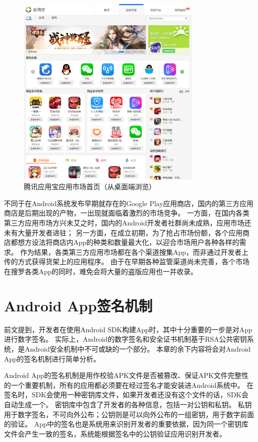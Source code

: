 \begin{figure}[htbp]
	\centering
	\includegraphics[width=0.8\textwidth]{./Figures/edwin-yyb.jpg}
	\caption{腾讯应用宝应用市场首页（从桌面端浏览）}
	\label{fig:mkt-yyb}
	\vspace{-5mm}
\end{figure}

不同于在Android系统发布早期就存在的Google Play应用商店，国内的第三方应用商店是后期出现的产物，一出现就面临着激烈的市场竞争。
一方面，在国内各类第三方应用市场方兴未艾之时，国内的Android开发者社群尚未成熟，应用市场还未有大量开发者进驻；
另一方面，在成立初期，为了抢占市场份额，各个应用商店都想方设法将商店内App的种类和数量最大化，以迎合市场用户各种各样的需求。
作为结果，各类第三方应用市场都在各个渠道搜集App，而非通过开发者上传的方式获得货架上的应用程序。
由于在早期各种监管渠道尚未完善，各个市场在搜罗各类App的同时，难免会将大量的盗版应用也一并收录。

\section{Android App签名机制}
\label{sec:signature}

前文提到，开发者在使用Android SDK构建App时，其中十分重要的一步是对App进行数字签名。
实际上，Android的数字签名和安全证书机制基于RSA公共密钥系统，是Android安全机制中不可或缺的一个部分。
本章的余下内容将会对Android App的签名机制进行简单分析。

Android App的签名机制是用作校验APK文件是否被篡改、保证APK文件完整性的一个重要机制，所有的应用都必须要在经过签名才能安装进Android系统中。
在签名时，SDK会使用一种密钥库文件，如果开发者还没有这个文件的话，SDK会自动生成一个。
密钥库中包含了开发者的各种信息，包括一对公钥和私钥。
私钥用于数字签名，不可向外公布；公钥则是可以向外公布的一组密钥，用于数字前面的验证。
App中的签名也是系统用来识别开发者的重要依据，因为同一个密钥库文件会产生一致的签名，系统能根据签名中的公钥验证应用识别开发者。

